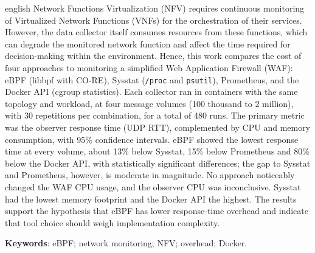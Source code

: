 \documentclass{ifpr-pinhais}
\begin{document}
\begin{resumo}[Abstract]
  \begin{otherlanguage*}{english}
    Network Functions Virtualization (NFV) requires continuous monitoring of Virtualized Network Functions (VNFs) for the orchestration of their services. However, the data collector itself consumes resources from these functions, which can degrade the monitored network function and affect the time required for decision-making within the environment. Hence, this work compares the cost of four approaches to monitoring a simplified Web Application Firewall (WAF): eBPF (libbpf with CO-RE), Sysstat (\texttt{/proc} and \texttt{psutil}), Prometheus, and the Docker API (cgroup statistics). Each collector ran in containers with the same topology and workload, at four message volumes (100 thousand to 2 million), with 30 repetitions per combination, for a total of 480 runs. The primary metric was the observer response time (UDP RTT), complemented by CPU and memory consumption, with 95\% confidence intervals. eBPF showed the lowest response time at every volume, about 13\% below Sysstat, 15\% below Prometheus and 80\% below the Docker API, with statistically significant differences; the gap to Sysstat and Prometheus, however, is moderate in magnitude. No approach noticeably changed the WAF CPU usage, and the observer CPU was inconclusive. Sysstat had the lowest memory footprint and the Docker API the highest. The results support the hypothesis that eBPF has lower response-time overhead and indicate that tool choice should weigh implementation complexity.

    \vspace{\onelineskip}
    \noindent
    \textbf{Keywords}: eBPF; network monitoring; NFV; overhead; Docker.
  \end{otherlanguage*}
\end{resumo}

\listoffigures*
\cleardoublepage


\listoftables*
\cleardoublepage

\end{document}

